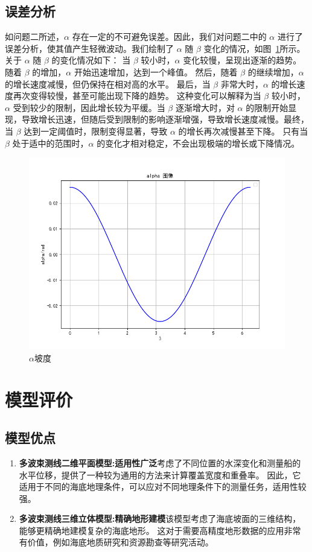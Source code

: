 \documentclass[withoutpreface,bwprint]{cumcmthesis} %
\begin{document}
    \subsection{误差分析}
    如问题二所述，$\alpha$ 存在一定的不可避免误差。因此，我们对问题二中的 $\alpha$ 进行了误差分析，使其值产生轻微波动。我们绘制了 $\alpha$ 随 $\beta$ 变化的情况，如图~\ref{21}所示。
    关于 $\alpha$ 随 $\beta$ 的变化情况如下：
    当 $\beta$ 较小时，$\alpha$ 变化较慢，呈现出逐渐的趋势。
    随着 $\beta$ 的增加，$\alpha$ 开始迅速增加，达到一个峰值。
    然后，随着 $\beta$ 的继续增加，$\alpha$ 的增长速度减慢，但仍保持在相对高的水平。
    最后，当 $\beta$ 非常大时，$\alpha$ 的增长速度再次变得较慢，甚至可能出现下降的趋势。
    这种变化可以解释为当 $\beta$ 较小时，$\alpha$ 受到较少的限制，因此增长较为平缓。当 $\beta$ 逐渐增大时，对 $\alpha$ 的限制开始显现，导致增长迅速，但随后受到限制的影响逐渐增强，导致增长速度减慢。最终，当 $\beta$ 达到一定阈值时，限制变得显著，导致 $\alpha$ 的增长再次减慢甚至下降。
    只有当 $\beta$ 处于适中的范围时，$\alpha$ 的变化才相对稳定，不会出现极端的增长或下降情况。
    
    \begin{figure}[htbp]
        \centering
        \includegraphics[width=.6\textwidth]{alpha.png}
        \caption{$\alpha$坡度}
        \label{21}
    \end{figure}

    \section{模型评价}
    \subsection{模型优点}
    \begin{enumerate}
        \item \textbf{多波束测线二维平面模型:适用性广泛}考虑了不同位置的水深变化和测量船的水平位移，提供了一种较为通用的方法来计算覆盖宽度和重叠率。
        因此，它适用于不同的海底地理条件，可以应对不同地理条件下的测量任务，适用性较强。
        \item \textbf{多波束测线三维立体模型:精确地形建模}该模型考虑了海底坡面的三维结构，能够更精确地建模复杂的海底地形。
        这对于需要高精度地形数据的应用非常有价值，例如海底地质研究和资源勘查等研究活动。
    \end{enumerate} 
\end{document}

